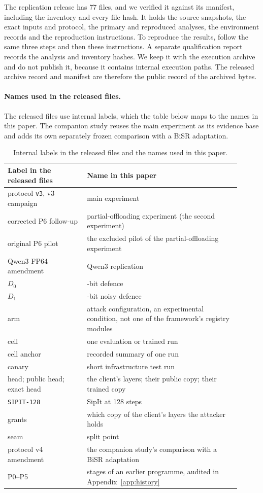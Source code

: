 \documentclass[11pt]{article}
\begin{document}
The replication release has 77 files, and we verified it against its manifest, including the inventory and every file hash. It holds the source snapshots, the exact inputs and protocol, the primary and reproduced analyses, the environment records and the reproduction instructions. To reproduce the results, follow the same three steps and then these instructions. A separate qualification report records the analysis and inventory hashes. We keep it with the execution archive and do not publish it, because it contains internal execution paths. The released archive record and manifest are therefore the public record of the archived bytes.

\paragraph{Names used in the released files.}
The released files use internal labels, which the table below maps to the names in this paper. The companion study reuses the main experiment as its evidence base and adds its own separately frozen comparison with a BiSR adaptation.

\begin{table}[H]
\centering
\small
\begin{tabular}{@{}>{\raggedright\arraybackslash}p{0.31\linewidth}>{\raggedright\arraybackslash}p{0.6\linewidth}@{}}
\toprule
Label in the released files & Name in this paper \\
\midrule
protocol \texttt{v3}, v3 campaign & main experiment \\
corrected P6 follow-up & partial-offloading experiment (the second experiment) \\
original P6 pilot & the excluded pilot of the partial-offloading experiment \\
Qwen3 FP64 amendment & Qwen3 replication \\
$D_0$ & 8-bit defence \\
$D_1$ & 4-bit noisy defence \\
arm & attack configuration, an experimental condition, not one of the framework's registry modules \\
cell & one evaluation or trained run \\
cell anchor & recorded summary of one run \\
canary & short infrastructure test run \\
head; public head; exact head & the client's layers; their public copy; their trained copy \\
\texttt{SIPIT-128} & SipIt at 128 steps \\
grants & which copy of the client's layers the attacker holds \\
seam & split point \\
protocol v4 amendment & the companion study's comparison with a BiSR adaptation \\
P0--P5 & stages of an earlier programme, audited in Appendix~\ref{app:history} \\
\bottomrule
\end{tabular}
\caption{Internal labels in the released files and the names used in this paper.}
\end{table}
\end{document}
